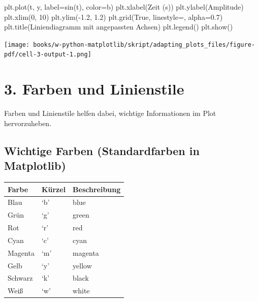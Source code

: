 \documentclass[
  letterpaper,
  DIV=11,
  numbers=noendperiod]{scrreprt}
\newenvironment{Shaded}{\begin{snugshade}}{\end{snugshade}}
\newcommand{\DecValTok}[1]{\textcolor[rgb]{0.68,0.00,0.00}{#1}}
\newcommand{\FloatTok}[1]{\textcolor[rgb]{0.68,0.00,0.00}{#1}}
\newcommand{\NormalTok}[1]{\textcolor[rgb]{0.00,0.23,0.31}{#1}}
\newcommand{\OperatorTok}[1]{\textcolor[rgb]{0.37,0.37,0.37}{#1}}
\newcommand{\StringTok}[1]{\textcolor[rgb]{0.13,0.47,0.30}{#1}}
\newcommand{\VariableTok}[1]{\textcolor[rgb]{0.07,0.07,0.07}{#1}}
\begin{document}
\begin{Shaded}
\begin{Highlighting}[]
\NormalTok{plt.plot(t, y, label}\OperatorTok{=}\StringTok{\textquotesingle{}sin(t)\textquotesingle{}}\NormalTok{, color}\OperatorTok{=}\StringTok{\textquotesingle{}b\textquotesingle{}}\NormalTok{)}
\NormalTok{plt.xlabel(}\StringTok{\textquotesingle{}Zeit (s)\textquotesingle{}}\NormalTok{)}
\NormalTok{plt.ylabel(}\StringTok{\textquotesingle{}Amplitude\textquotesingle{}}\NormalTok{)}
\NormalTok{plt.xlim(}\DecValTok{0}\NormalTok{, }\DecValTok{10}\NormalTok{)}
\NormalTok{plt.ylim(}\OperatorTok{{-}}\FloatTok{1.2}\NormalTok{, }\FloatTok{1.2}\NormalTok{)}
\NormalTok{plt.grid(}\VariableTok{True}\NormalTok{, linestyle}\OperatorTok{=}\StringTok{\textquotesingle{}{-}{-}\textquotesingle{}}\NormalTok{, alpha}\OperatorTok{=}\FloatTok{0.7}\NormalTok{)}
\NormalTok{plt.title(}\StringTok{\textquotesingle{}Liniendiagramm mit angepassten Achsen\textquotesingle{}}\NormalTok{)}
\NormalTok{plt.legend()}
\NormalTok{plt.show()}
\end{Highlighting}
\end{Shaded}

\texttt{[image: books/w-python-matplotlib/skript/adapting\_plots\_files/figure-pdf/cell-3-output-1.png]}

\section{3. Farben und Linienstile}\label{farben-und-linienstile}

Farben und Linienstile helfen dabei, wichtige Informationen im Plot
hervorzuheben.

\subsection{Wichtige Farben (Standardfarben in
Matplotlib)}\label{wichtige-farben-standardfarben-in-matplotlib}

\begin{longtable}[]{@{}lll@{}}
\toprule\noalign{}
Farbe & Kürzel & Beschreibung \\
\midrule\noalign{}
\endhead
\bottomrule\noalign{}
\endlastfoot
Blau & `b' & blue \\
Grün & `g' & green \\
Rot & `r' & red \\
Cyan & `c' & cyan \\
Magenta & `m' & magenta \\
Gelb & `y' & yellow \\
Schwarz & `k' & black \\
Weiß & `w' & white \\
\end{longtable}
\end{document}
